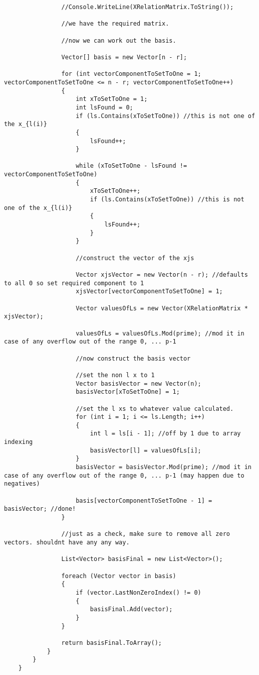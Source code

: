 \documentclass{article}
\begin{document}
\begin{lstlisting}
				//Console.WriteLine(XRelationMatrix.ToString());
				
				//we have the required matrix.
				
				//now we can work out the basis.
				
				Vector[] basis = new Vector[n - r];
				
				for (int vectorComponentToSetToOne = 1; vectorComponentToSetToOne <= n - r; vectorComponentToSetToOne++)
				{
					int xToSetToOne = 1;
					int lsFound = 0;
					if (ls.Contains(xToSetToOne)) //this is not one of the x_{l(i)}
					{
						lsFound++;
					}
					
					while (xToSetToOne - lsFound != vectorComponentToSetToOne)
					{
						xToSetToOne++;
						if (ls.Contains(xToSetToOne)) //this is not one of the x_{l(i)}
						{
							lsFound++;
						}
					}
					
					//construct the vector of the xjs
					
					Vector xjsVector = new Vector(n - r); //defaults to all 0 so set required component to 1
					xjsVector[vectorComponentToSetToOne] = 1;
					
					Vector valuesOfLs = new Vector(XRelationMatrix * xjsVector);
					
					valuesOfLs = valuesOfLs.Mod(prime); //mod it in case of any overflow out of the range 0, ... p-1
					
					//now construct the basis vector
					
					//set the non l x to 1
					Vector basisVector = new Vector(n);
					basisVector[xToSetToOne] = 1;
					
					//set the l xs to whatever value calculated.
					for (int i = 1; i <= ls.Length; i++)
					{
						int l = ls[i - 1]; //off by 1 due to array indexing
						basisVector[l] = valuesOfLs[i];
					}
					basisVector = basisVector.Mod(prime); //mod it in case of any overflow out of the range 0, ... p-1 (may happen due to negatives)
					
					basis[vectorComponentToSetToOne - 1] = basisVector; //done!
				}
				
				//just as a check, make sure to remove all zero vectors. shouldnt have any any way.
				
				List<Vector> basisFinal = new List<Vector>();
				
				foreach (Vector vector in basis)
				{
					if (vector.LastNonZeroIndex() != 0)
					{
						basisFinal.Add(vector);
					}
				}
				
				return basisFinal.ToArray();
			}
		}
	}
	
\end{lstlisting}
\end{document}
